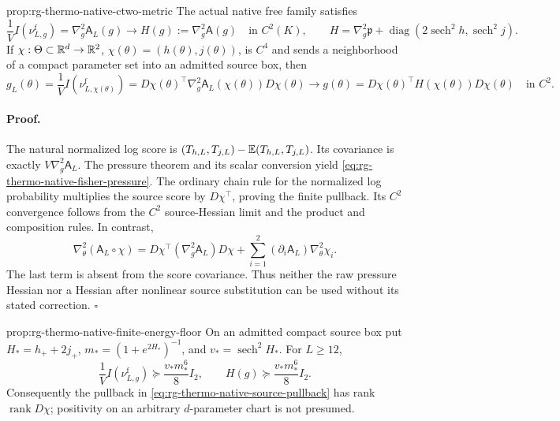 {prop:rg-thermo-native-ctwo-metric}
The actual native free family satisfies
\begin{equation}
 \frac1V I(\nu^{\mathrm f}_{L,g})=\nabla_g^2\mathsf A_L(g)
 \longrightarrow H(g):=\nabla_g^2\mathsf A(g)
 \quad\text{in }C^2(K),
 \qquad
 H=\nabla_g^2\mathfrak p+
      \operatorname{diag}(2\operatorname{sech}^2h,
                              \operatorname{sech}^2j).
 \label{eq:rg-thermo-native-fisher-pressure}
\end{equation}
If \(\chi:\Theta\subset\mathbb R^d\to\mathbb R^2\),
\(\chi(\theta)=(h(\theta),j(\theta))\), is \(C^4\) and sends a
neighborhood of a compact parameter set into an admitted source box, then
\begin{equation}
 g_L(\theta)=\frac1V I(\nu^{\mathrm f}_{L,\chi(\theta)})
 =D\chi(\theta)^\top\nabla_g^2\mathsf A_L(\chi(\theta))D\chi(\theta)
 \longrightarrow
 g(\theta)=D\chi(\theta)^\top H(\chi(\theta))D\chi(\theta)
 \quad\text{in }C^2.
 \label{eq:rg-thermo-native-source-pullback}
\end{equation}\thermoestablishedstatus


\paragraph{Proof.}
The natural normalized log score is
\((T_{h,L},T_{j,L})-\mathbb E(T_{h,L},T_{j,L})\). Its covariance is exactly
\(V\nabla_g^2\mathsf A_L\). The pressure theorem and its scalar
conversion yield \cref{eq:rg-thermo-native-fisher-pressure}. The ordinary
chain rule for the normalized log probability multiplies the source score
by \(D\chi^\top\), proving the finite pullback. Its \(C^2\) convergence
follows from the \(C^2\) source-Hessian limit and the product and
composition rules. In contrast,
\begin{equation}
 \nabla_\theta^2(\mathsf A_L\circ\chi)
 =D\chi^\top(\nabla_g^2\mathsf A_L)D\chi
   +\sum_{i=1}^2(\partial_i\mathsf A_L)\nabla_\theta^2\chi_i.
 \label{eq:rg-thermo-native-nonnatural-hessian}
\end{equation}
The last term is absent from the score covariance. Thus neither the raw
pressure Hessian nor a Hessian after nonlinear source substitution can be
used without its stated correction. \hfill\(\square\)

{prop:rg-thermo-native-finite-energy-floor}
On an admitted compact source box put
\(H_*=h_++2j_+\), \(m_*=(1+e^{2H_*})^{-1}\), and
\(v_* =\operatorname{sech}^2 H_*\). For \(L\ge12\),
\begin{equation}
 \frac1V I(\nu^{\mathrm f}_{L,g})\succeq
       \frac{v_*m_*^6}{8}I_2,
 \qquad H(g)\succeq\frac{v_*m_*^6}{8}I_2.
 \label{eq:rg-thermo-native-compact-floor}
\end{equation}
Consequently the pullback in
\cref{eq:rg-thermo-native-source-pullback} has rank
\(\operatorname{rank}D\chi\); positivity on an arbitrary \(d\)-parameter
chart is not presumed.\thermoestablishedstatus


